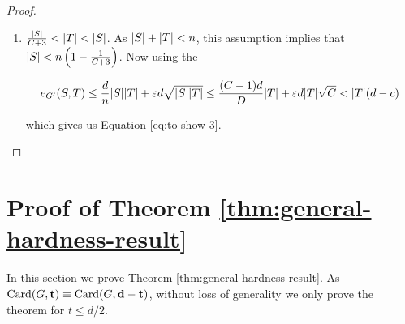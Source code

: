 \documentclass[11pt]{article}
\begin{document}
\begin{proof}
\begin{enumerate}
\item{
$ \frac{\Size{S}}{C+3} < \Size{T} < \Size{S}$. As $\Size{S} + \Size{T} < n$, this assumption implies that $\Size{S} < n\left(1 - \frac{1}{C+3}\right)$.
Now using the 

\[ \CutEdges{S}{T}{G'} \le \frac{d}{n}\Size{S}\Size{T} + \epsilon d \sqrt{\Size{S}\Size{T}} \le \frac{(C-1)d}{D}\Size{T} + \epsilon d \Size{T}\sqrt{C} < \Size{T}(d-c)\]

which gives us Equation \eqref{eq:to-show-3}.
  }

\end{enumerate}
\end{proof}  



\section{Proof of Theorem \ref{thm:general-hardness-result}}
\label{sec:main-proof}

In this section we prove Theorem \ref{thm:general-hardness-result}. As $\Card{G, \vec{t}} \equiv \Card{G, \vec{d-t}}$, without loss of generality we only prove the theorem for $t \le d/2$. 
\end{document}
